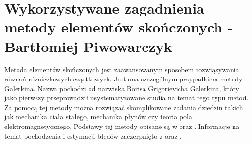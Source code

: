 
\chapter{Wykorzystywane zagadnienia metody elementów skończonych - Bartłomiej Piwowarczyk}
\label{cha:MES_chapter}
Metoda elementów skończonych jest zaawansowanym sposobem rozwiązywania równań różniczkowych cząstkowych. Jest ona szczególnym przypadkiem metody Galerkina. Nazwa pochodzi od nazwiska Borisa Grigorievicha Galerkina, który jako pierwszy przeprowadził usystematyzowane studia na temat tego typu metod. Za pomocą tej metody można rozwiązać skomplikowane zadania dziedzin takich jak mechanika ciała stałego, mechanika płynów czy teoria pola elektromagnetycznego. Podstawy tej metody opisane są w \cite{bartek_srodka} oraz \cite{bartek_gavin}. Informacje na temat pochodzenia i estymacji błędów zaczerpnięto z \cite{bartek_pointer} oraz \cite{bartek_erke}.




































